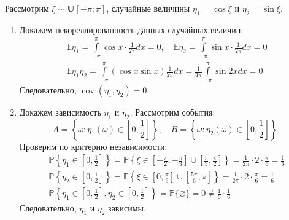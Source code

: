 \hypertarget{counter_exmp_independence}{}
\begin{exmp}
    Рассмотрим $\xi \sim \mathbf{U}[-\pi;\pi]$, случайные величины ${\eta_{1}=\cos \xi}$ и ${\eta_{2}=\sin \xi}$.
    \begin{enumerate}
        \item 
            Докажем некореллированность данных случайных величин.
            \begin{gather*}
                \mathbb{E} \eta_{1}=\int\limits_{-\pi}^{\pi} \cos x \cdot \frac{1}{2 \pi} d x=0, \quad \mathbb{E} \eta_{2}=\int\limits_{-\pi}^{\pi} \sin x \cdot \frac{1}{2 \pi} d x=0 \\
                \mathbb{E} \eta_{1} \eta_{2}=\int\limits_{-\pi}^{\pi}(\cos x \sin x) \frac{1}{2 \pi} d x=\frac{1}{4 \pi} \int\limits_{-\pi}^{\pi} \sin 2 x d x=0
            \end{gather*}
            Следовательно, $\operatorname{cov}(\eta_1, \eta_2) = 0$.
        \item 
            Докажем зависимость $\eta_1$ и $\eta_2$. Рассмотрим события:
            \begin{equation*}
                A = \left\{\omega \colon \eta_1(\omega) \in \left[0, \frac{1}{2} \right] \right\}, \quad
                B = \left\{\omega \colon \eta_2(\omega) \in \left[0, \frac{1}{2} \right] \right\},
            \end{equation*}
            Проверим по критерию независимости:
            \begin{gather*}
                \mathbb{P}\left\{\eta_{1} \in\left[0, \frac{1}{2}\right]\right\}=\mathbb{P}\left\{\xi \in\left[-\frac{\pi}{2},-\frac{\pi}{3}\right] \cup\left[\frac{\pi}{3}, \frac{\pi}{2}\right]\right\}=\frac{1}{2 \pi} \cdot 2 \cdot \frac{\pi}{6}=\frac{1}{6} \\
                \mathbb{P}\left\{\eta_{2} \in\left[0, \frac{1}{2}\right]\right\}=\mathbb{P}\left\{\xi \in\left[0, \frac{\pi}{6}\right] \cup\left[\frac{5 \pi}{6}, \pi\right]\right\}=\frac{1}{2 \pi} \cdot 2 \cdot \frac{\pi}{6}=\frac{1}{6} \\
                \mathbb{P}\left\{\eta_{1} \in\left[0, \frac{1}{2}\right], \eta_{2} \in\left[0, \frac{1}{2}\right]\right\}=\mathbb{P}\{\varnothing\}=0 \neq \frac{1}{6} \cdot \frac{1}{6}
            \end{gather*}
            Следовательно, $\eta_1$ и $\eta_2$ зависимы.
    \end{enumerate}
\end{exmp}

